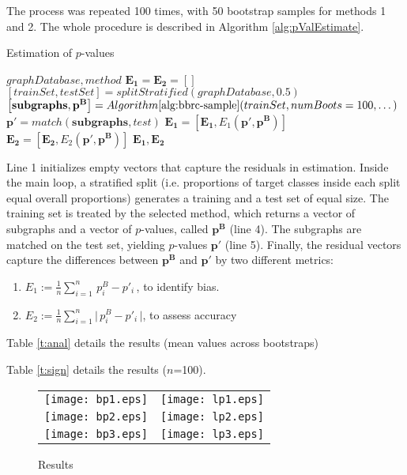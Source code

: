 \documentclass{article}
\begin{document}
The process was repeated 100 times, with 50 bootstrap samples for methods 1 and 2. The whole procedure is described in Algorithm \ref{alg:pValEstimate}.
\begin{algorithm}
  \caption{Estimation of $p$-values}
  \label{alg:pValEstimate}
  {\small \begin{algorithmic}[1]
  \Require $graphDatabase, method$ 
  \State $\mathbf{E_1}=\mathbf{E_2}=\left[ \right]$
    \State $[trainSet, testSet] = splitStratified(graphDatabase,0.5)$ 
    \State $\left[ \mathbf{subgraphs}, \mathbf{p^B} \right] = Algorithm \ref{alg:bbrc-sample}(trainSet,numBoots=100,\dots)$ 
    \State $\mathbf{p'} = match(\mathbf{subgraphs}, test)$ 
    \State $ \mathbf{E_1} = \left[ \mathbf{E_1}, E_1(\mathbf{p'}, \mathbf{p^B}) \right]$
    \State $ \mathbf{E_2} = \left[ \mathbf{E_2}, E_2(\mathbf{p'}, \mathbf{p^B}) \right]$
  \EndFor
  \Ensure $\mathbf{E_1},\mathbf{E_2}$
\end{algorithmic}}
\end{algorithm}

Line 1 initializes empty vectors that capture the residuals in
estimation. Inside the main loop, a stratified split (i.e. proportions of
target classes inside each split equal overall proportions) generates a training
and a test set of equal size. The training set is treated by the selected method,
which returns a vector of subgraphs and a vector of $p$-values, called
$\mathbf{p^B}$ (line 4). The subgraphs are matched on the test set, yielding
$p$-values $\mathbf{p'}$ (line 5). Finally, the residual vectors capture the
differences between $\mathbf{p^B}$ and  $\mathbf{p'}$ by two different metrics:

\begin{enumerate}
  \item $E_1 := \frac{1}{n} \sum_{i=1}^n \,p^B_i -p'_i \,$, to identify bias.
  \item $E_2 := \frac{1}{n} \sum_{i=1}^n \Big|\,p^B_i -p'_i \,\Big|$, to assess accuracy
\end{enumerate}

Table \ref{t:anal} details the results (mean values across bootstraps)


Table \ref{t:sign} details the results ($n$=100). 


\begin{figure}[t]
  \begin{tabular}{cc}
   \texttt{[image: bp1.eps]} & \texttt{[image: lp1.eps]} \\
   \texttt{[image: bp2.eps]} & \texttt{[image: lp2.eps]} \\
   \texttt{[image: bp3.eps]} & \texttt{[image: lp3.eps]} \\
  \end{tabular}
  \caption{Results}
  \label{fig:bplp13}
\end{figure}
\end{document}
